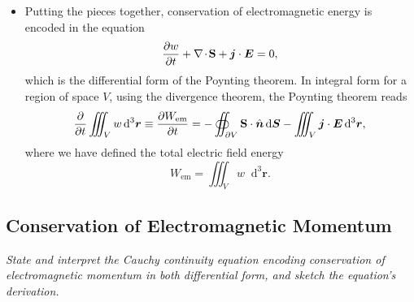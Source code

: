 \documentclass[11pt, a4paper]{article}
\newcommand{\diff}{\mathop{}\!\mathrm{d}} %
\newcommand{\dr}{\diff^{3} \r}  %
\newcommand{\Poy}{Poynting\xspace}
\renewcommand{\vec}[1]{\bm{#1}} %
\newcommand{\uvec}[1]{\hat{\vec{#1}}} %
\renewcommand{\r}{\vec{r}}
\newcommand{\E}{\vec{E}} %
\renewcommand{\S}{\mathbf{S}}  %
\renewcommand{\j}{\vec{j}}  %
\renewcommand{\div}{\nabla \mspace{-2mu} \cdot \mspace{-2mu}}
\begin{document}
\begin{itemize}
	\item Putting the pieces together, conservation of electromagnetic energy is encoded in the equation
	\begin{equation*}
        \pdv{w}{t} + \div \S + \j \cdot \E = 0,
	\end{equation*}
    which is the differential form of the \Poy theorem. In integral form for a region of space $ V $, using the divergence theorem, the \Poy theorem reads
	\begin{equation*}
		\pdv{t}\iiint_{V}w \dr \equiv \pdv{W_{\text{em}}}{t} = - \oiint_{\partial V} \S \cdot \uvec{n} \diff \vec{S} - \iiint_{V} \j \cdot \E \dr,
	\end{equation*}
    where we have defined the total electric field energy
    \begin{equation*}
        W_{\text{em}} = \iiint_{V} w \dr.
    \end{equation*}
    
\end{itemize}

    
\subsection{Conservation of Electromagnetic Momentum}
\textit{State and interpret the Cauchy continuity equation encoding conservation of electromagnetic momentum in both differential form, and sketch the equation's derivation.}
\end{document}

